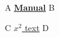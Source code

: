 \documentclass{article}
\begin{document}
A \hyperref{univie-ling-expose.pdf}{}{}{\textbf{Manual}} B

C \hyperref{doc.pdf}{section}{intro}{$x^2$ text} D
\end{document}
